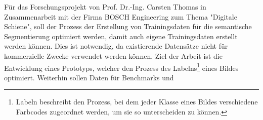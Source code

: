 \documentclass[11pt]{scrartcl}
\begin{document}
Für das Forschungsprojekt von Prof. Dr.-Ing. Carsten Thomas in Zusammenarbeit mit der Firma BOSCH Engineering zum Thema "Digitale Schiene", soll der Prozess der Erstellung von Trainingsdaten für die semantische Segmentierung optimiert werden, damit auch eigene Trainingsdaten erstellt werden können. Dies ist notwendig, da existierende Datensätze nicht für kommerzielle Zwecke verwendet werden können. Ziel der Arbeit ist die Entwicklung eines Prototyps, welcher den Prozess des Labelns\footnote{Labeln beschreibt den Prozess, bei dem jeder Klasse eines Bildes verschiedene Farbcodes zugeordnet werden, um sie so unterscheiden zu können.} eines Bildes optimiert. Weiterhin sollen Daten für Benchmarks und                                                                                                                                                                                                                                                                                                                                                                                                                                                                                                                                                                                                                                                                                                                                                                                                                                                                                                                                                                                                                                                                                                                                                                                                                                                                                                                                                                                                                                                                                                                                                                                                                                                                                                                                                                                                                                                                                                                                                                                                                                                                                                                                                                                                                                                                                                                                                                                                                                                                                                                                                                                                                                                                                                                                        
\end{document}
